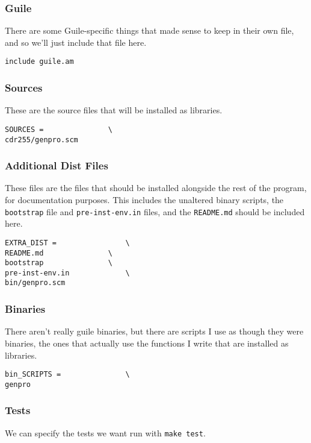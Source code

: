 \documentclass[11pt]{article}
\begin{document}
\subsubsection{Guile}
\label{sec:orgf107771}
There are some Guile-specific things that made sense to keep in their own file,
and so we'll just include that file here.
\begin{verbatim}
include guile.am

\end{verbatim}

\subsubsection{Sources}
\label{sec:org7e8e94a}
These are the source files that will be installed as libraries.

\begin{verbatim}
SOURCES =				\
cdr255/genpro.scm

\end{verbatim}

\subsubsection{Additional Dist Files}
\label{sec:org508ac8b}
These files are the files that should be installed alongside the rest of the
program, for documentation purposes. This includes the unaltered binary scripts,
the \texttt{bootstrap} file and \texttt{pre-inst-env.in} files, and the \texttt{README.md} should be
included here.

\begin{verbatim}
EXTRA_DIST =				\
README.md				\
bootstrap				\
pre-inst-env.in				\
bin/genpro.scm

\end{verbatim}

\subsubsection{Binaries}
\label{sec:org3c40d0a}
There aren't really guile binaries, but there are scripts I use as though they
were binaries, the ones that actually use the functions I write that are
installed as libraries.

\begin{verbatim}
bin_SCRIPTS =				\
genpro

\end{verbatim}

\subsubsection{Tests}
\label{sec:org187f6e9}
We can specify the tests we want run with \texttt{make test}.
\end{document}
